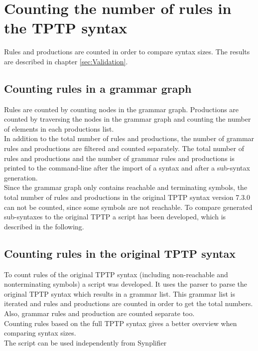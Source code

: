 \section{Counting the number of rules in the TPTP syntax}\label{sec:ConceptCountR}

Rules and productions are counted in order to compare syntax sizes. The results are described in chapter \ref{sec:Validation}.

\subsection{Counting rules in a grammar graph}\label{sec:ConceptCountR}
 
Rules are counted by counting nodes in the grammar graph. Productions are counted by traversing the nodes in the grammar graph and counting the number of elements in each productions list.\\
In addition to the total number of rules and productions, the number of grammar rules and productions are filtered and counted separately.
The total number of rules and productions and the number of grammar rules and productions is printed to the command-line after the import of a syntax and after a sub-syntax generation. \\
Since the grammar graph only contains reachable and terminating symbols, the total number of rules and productions in the original \ac{TPTP} syntax version 7.3.0 can not be counted, since some symbols are not reachable.
To compare generated sub-syntaxes to the original \ac{TPTP} a script has been developed, which is described in the following.

\subsection{Counting rules in the original \ac{TPTP} syntax}\label{sec:ConceptCountR}

To count rules of the original \ac{TPTP} syntax (including non-reachable and nonterminating symbols) a script was developed.
It uses the parser to parse the original \ac{TPTP} syntax which results in a grammar list. This grammar list is iterated and rules and productions are counted in order to get the total numbers. Also, grammar rules and production are counted separate too.\\
Counting rules based on the full \ac{TPTP} syntax gives a better overview when comparing syntax sizes.\\
The script can be used independently from \ac{Synplifier}

